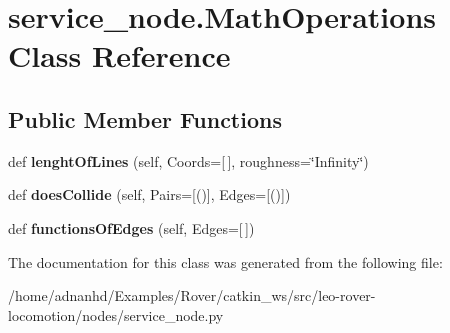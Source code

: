 \hypertarget{classservice__node_1_1MathOperations}{}\section{service\+\_\+node.\+Math\+Operations Class Reference}
\label{classservice__node_1_1MathOperations}
\subsection*{Public Member Functions}
\begin{DoxyCompactItemize}
\item 
\mbox{\label{classservice__node_1_1MathOperations_af40dad96f5992cbd8ea64793050ca100}} 
def {\bfseries lenght\+Of\+Lines} (self, Coords=\mbox{[}$\,$\mbox{]}, roughness=\char`\"{}Infinity\char`\"{})
\item 
\mbox{\label{classservice__node_1_1MathOperations_a44c83fcab4c8fbed72c5b4a284441c7e}} 
def {\bfseries does\+Collide} (self, Pairs=\mbox{[}()\mbox{]}, Edges=\mbox{[}()\mbox{]})
\item 
\mbox{\label{classservice__node_1_1MathOperations_ace96f7bbddc5b3f76973f7cfc792e043}} 
def {\bfseries functions\+Of\+Edges} (self, Edges=\mbox{[}$\,$\mbox{]})
\end{DoxyCompactItemize}


The documentation for this class was generated from the following file\+:\begin{DoxyCompactItemize}
\item 
/home/adnanhd/\+Examples/\+Rover/catkin\+\_\+ws/src/leo-\/rover-\/locomotion/nodes/service\+\_\+node.\+py\end{DoxyCompactItemize}
